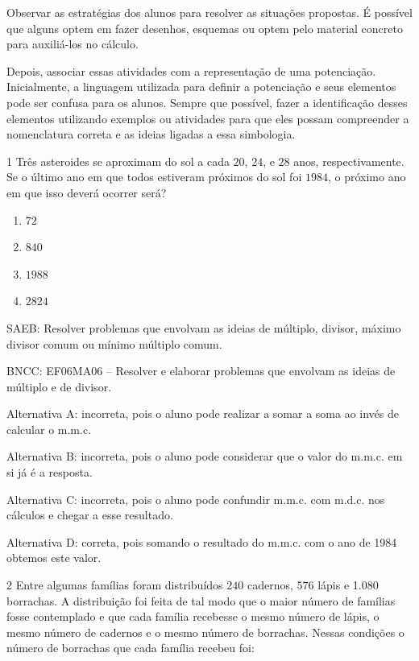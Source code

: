 Observar as estratégias dos alunos para resolver as situações propostas.
É possível que alguns optem em fazer desenhos, esquemas ou optem pelo
material concreto para auxiliá-los no cálculo.

Depois, associar essas atividades com a representação de uma
potenciação. Inicialmente, a linguagem utilizada para definir a
potenciação e seus elementos pode ser confusa para os alunos. Sempre que
possível, fazer a identificação desses elementos utilizando exemplos ou
atividades para que eles possam compreender a nomenclatura correta e as
ideias ligadas a essa simbologia.


\num{1}  Três asteroides se aproximam do sol a cada $20$, $24$, e $28$ anos,
respectivamente. Se o último ano em que todos estiveram próximos do sol
foi $1984$, o próximo ano em que isso deverá ocorrer será?

\begin{enumerate}
\def\labelenumi{\alph{enumi})}
\item
  $72$
\item
  $840$
\item
  $1988$
\item
  $2824$
\end{enumerate}

SAEB: Resolver problemas que envolvam as ideias de múltiplo, divisor,
máximo divisor comum ou mínimo múltiplo comum.

BNCC: EF06MA06 -- Resolver e elaborar problemas que envolvam as ideias
de múltiplo e de divisor.

Alternativa A: incorreta, pois o aluno pode realizar a somar a soma ao
invés de calcular o m.m.c.

Alternativa B: incorreta, pois o aluno pode considerar que o valor do
m.m.c. em si já é a resposta.

Alternativa C: incorreta, pois o aluno pode confundir m.m.c. com m.d.c.
nos cálculos e chegar a esse resultado.

Alternativa D: correta, pois somando o resultado do m.m.c. com o ano de
1984 obtemos este valor.

\num{2}  Entre algumas famílias foram distribuídos $240$ cadernos, $576$ lápis e
1.080 borrachas. A distribuição foi feita de tal modo que o maior número
de famílias fosse contemplado e que cada família recebesse o mesmo
número de lápis, o mesmo número de cadernos e o mesmo número de
borrachas. Nessas condições o número de borrachas que cada família
recebeu foi:

